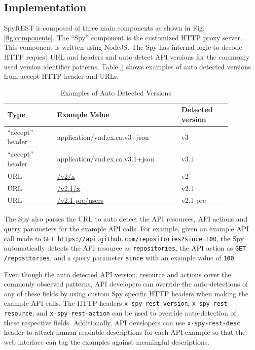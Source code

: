 \subsection{Implementation} %
\label{sub:implementation}

SpyREST is composed of three main components as shown in Fig. \ref{fig:components}. The ``Spy'' component is the customized HTTP proxy server. This component is written using NodeJS. The Spy has internal logic to decode HTTP request URL and headers and auto-detect API versions for the commonly used version identifier patterns. Table \ref{table:versions} shows examples of auto detected versions from accept HTTP header and URLs.

\begin{table}[!tbh]
  \caption{Examples of Auto Detected Versions}
  \begin{tabular}{|p{0.2\linewidth}|p{0.5\linewidth}|p{0.2\linewidth}|}
    \hline
    \textbf{Type} & \textbf{Example Value} & \textbf{Detected version}\\
    \hline
    ``accept'' header & application/vnd.ex.ca.v3+json & v3\\
    \hline
    ``accept'' header & application/vnd.ex.ca.v3.1+json & v3.1\\
    \hline
    URL & \url{/v2/x} & v2\\
    \hline
    URL & \url{/v2.1/x} & v2.1\\
    \hline
    URL & \url{/v2.1-pre/users} & v2.1-pre\\
    \hline
  \end{tabular}
  \label{table:versions}
\end{table}

The Spy also parses the URL to auto detect the API resources, API actions and query parameters for the example API calls. For example, given an example API call made to \texttt{GET \url{https://api.github.com/repositories?since=100}}, the Spy automatically detects the API resource as \texttt{repositories}, the API action as \texttt{GET /repositories}, and a query parameter \texttt{since} with an example value of \texttt{100}.

Even though the auto detected API version, resource and actions cover the commonly observed patterns, API developers can override the auto-detections of any of these fields by using custom Spy specific HTTP headers when making the example API calls. The HTTP headers \texttt{x-spy-rest-version}, \texttt{x-spy-rest-resource}, and \texttt{x-spy-rest-action} can be used to override auto-detection of these respective fields. Additionally, API developers can use \texttt{x-spy-rest-desc} header to attach human readable descriptions for each API example so that the web interface can tag the examples against meaningful descriptions.

